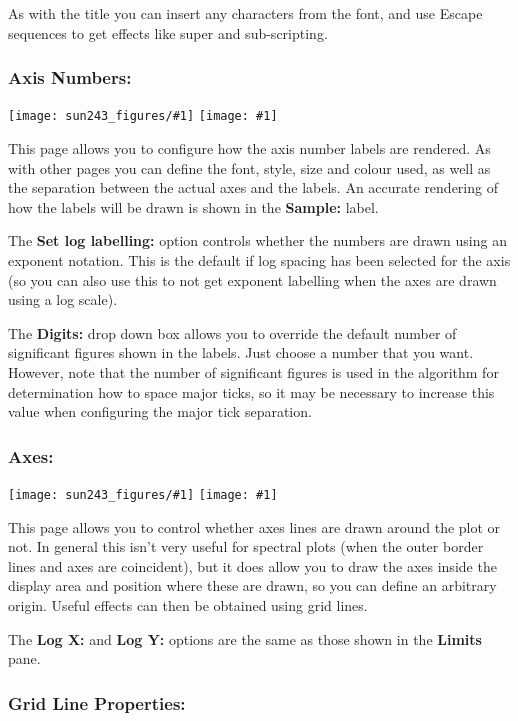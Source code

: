 \documentclass[twoside,11pt,nolof]{starlink}
\providecommand{\mainfigure}[1]
{\begin{center}
    \ifpdf
    \texttt{[image: sun243\_figures/\#1]}
    \else
    \texttt{[image: \#1]}
    \fi
 \end{center}
}
\newcommand{\labelitem}[1]{\textbf{#1}}
\begin{document}
As with the title you can insert any characters from the font, and use
 Escape sequences to get effects like super and
sub-scripting.

\newpage
\subsubsection*{Axis Numbers:}

\mainfigure{configurewindowaxisnumbers}

This page allows you to configure how the axis number labels are rendered. As
with other pages you can define the font, style, size and colour used, as well
as the separation between the actual axes and the labels. An accurate
rendering of how the labels will be drawn is shown in the \labelitem{Sample:}
label.

The \labelitem{Set log labelling:} option controls whether the numbers are
drawn using an exponent notation. This is the default if log spacing has been
selected for the axis (so you can also use this to not get exponent labelling
when the axes are drawn using a log scale).

The \labelitem{Digits:} drop down box allows you to override the
default number of significant figures shown in the labels. Just choose
a number that you want. However, note that the number of significant
figures is used in the algorithm for determination how to space major
ticks, so it may be necessary to increase this value when configuring
the major tick separation.

\newpage
\subsubsection*{Axes:}

\mainfigure{configurewindowaxes}

This page allows you to control whether axes lines are drawn around the plot
or not. In general this isn't very useful for spectral plots (when the outer
border lines and axes are coincident), but it does allow you to draw the axes
inside the display area and position where these are drawn, so you can define
an arbitrary origin. Useful effects can then be obtained using grid lines.

The \labelitem{Log X:} and \labelitem{Log Y:} options are the same as those
shown in the \labelitem{Limits} pane.

\newpage
\subsubsection*{Grid Line Properties:}
\end{document}

